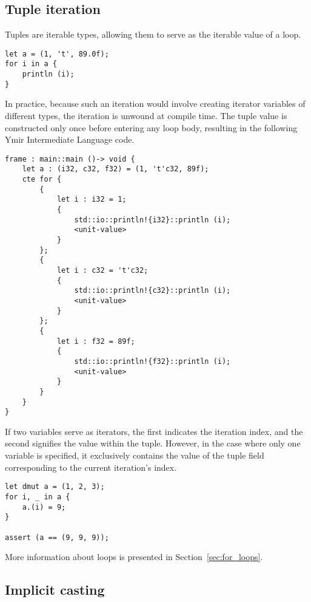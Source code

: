 \subsection {Tuple iteration}

Tuples are iterable types, allowing them to serve as the iterable value of a  loop.

\begin{lstlisting}[style=coloredverbatim]
let a = (1, 't', 89.0f);
for i in a {
    println (i);
}
\end{lstlisting}

In practice, because such an iteration would involve creating iterator variables
of different types, the iteration is unwound at compile time. The tuple value is
constructed only once before entering any loop body, resulting in the following
Ymir Intermediate Language code.

\begin{lstlisting}[style=intermediateVerb]
frame : main::main ()-> void {
    let a : (i32, c32, f32) = (1, 't'c32, 89f);
    cte for {
        {
            let i : i32 = 1;
            {
                std::io::println!{i32}::println (i);
                <unit-value>
            }
        };
        {
            let i : c32 = 't'c32;
            {
                std::io::println!{c32}::println (i);
                <unit-value>
            }
        };
        {
            let i : f32 = 89f;
            {
                std::io::println!{f32}::println (i);
                <unit-value>
            }
        }
    }
}
\end{lstlisting}

If two variables serve as iterators, the first indicates the iteration index,
and the second signifies the value within the tuple. However, in the case where
only one variable is specified, it exclusively contains the value of the tuple
field corresponding to the current iteration's index.

\begin{lstlisting}[style=coloredverbatim]
let dmut a = (1, 2, 3);
for i, _ in a {
    a.(i) = 9;
}

assert (a == (9, 9, 9));
\end{lstlisting}

More information about  loops is presented in Section~\ref{sec:for_loops}.

\subsection {Implicit casting}

